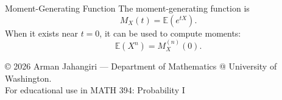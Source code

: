 \documentclass[11pt]{article}
\begin{document}
\begin{distbox}{Moment-Generating Function}
The moment-generating function is
\[
M_X(t)=\mathbb{E}(e^{tX}).
\]
When it exists near $t=0$, it can be used to compute moments:
\[
\mathbb{E}(X^n)=M_X^{(n)}(0).
\]
\end{distbox}

\begin{center}
{\footnotesize
© 2026 Arman Jahangiri — Department of Mathematics @ University of Washington.\\
For educational use in MATH 394: Probability I
}
\end{center}
\end{document}
